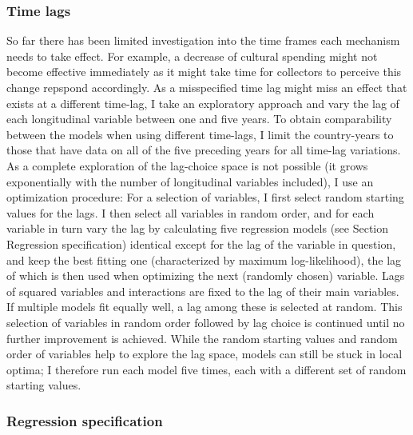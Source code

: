 \documentclass[11pt]{article}
\begin{document}
\subsubsection*{Time lags}

So far there has been limited investigation into the time frames each mechanism needs to take effect.
For example, a decrease of cultural spending might not become effective immediately as it might take time for collectors to perceive this change repspond accordingly.
As a misspecified time lag might miss an effect that exists at a different time-lag, I take an exploratory approach and vary the lag of each longitudinal variable between one and five years.
To obtain comparability between the models when using different time-lags, I limit the country-years to those that have data on all of the five preceding years for all time-lag variations.
As a complete exploration of the lag-choice space is not possible (it grows exponentially with the number of longitudinal variables included), I use an optimization procedure:
For a selection of variables, I first select random starting values for the lags.
I then select all variables in random order, and for each variable in turn vary the lag by calculating five regression models (see Section Regression specification) identical except for the lag of the variable in question, and keep the best fitting one (characterized by maximum log-likelihood), the lag of which is then used when optimizing the next (randomly chosen) variable.
Lags of squared variables and interactions are fixed to the lag of their main variables.
If multiple models fit equally well, a lag among these is selected at random.
This selection of variables in random order followed by lag choice is continued until no further improvement is achieved.
While the random starting values and random order of variables help to explore the lag space, models can still be stuck in local optima; I therefore run each model five times, each with a different set of random starting values. 



\subsubsection*{Regression specification}
\end{document}
